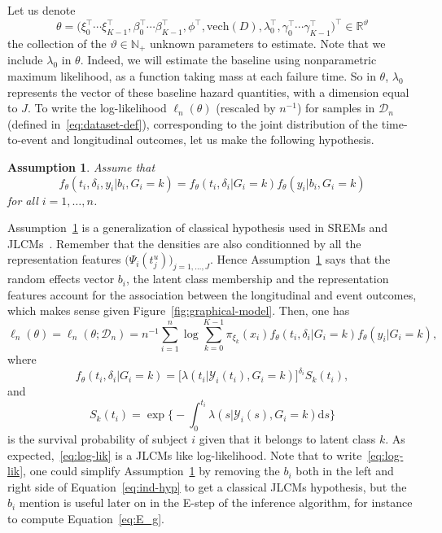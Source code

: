 \documentclass[11pt]{article}
\newtheorem{assumption}{Assumption}{\bf}{\rm}
\newcommand{\dd}{\mathrm{d}}
\newcommand{\cY}{\mathcal Y}
\newcommand{\cD}{\mathcal D}
\newcommand{\R}{\mathds R}
\newcommand{\N}{\mathds N}
\begin{document}
Let us denote 
\[ \theta = \big(\xi_0^\top \cdots \xi_{K-1}^\top, \beta_0^\top \cdots \beta_{K-1}^\top, \phi^\top, \text{vech}(D), \lambda_0^\top, \gamma_0^\top \cdots \gamma_{K-1}^\top\big)^\top \in \R^\vartheta \]
the collection of the $\vartheta \in \N_+$ unknown parameters to estimate. Note that we include $\lambda_0$ in $\theta$. Indeed, we will estimate the baseline using nonparametric maximum likelihood, as a function taking mass at each failure time. So in $\theta$, $\lambda_0$ represents the vector of these baseline hazard quantities, with a dimension equal to $J$.
To write the log-likelihood $\ell_n(\theta)$ (rescaled by $n^{-1}$)  for samples in $\cD_n$ (defined in~\eqref{eq:dataset-def}), corresponding to the joint distribution of the time-to-event and longitudinal outcomes, let us make the following hypothesis.
\begin{assumption}
\label{indep-hyp-3}
Assume that
\begin{equation}
  \label{eq:ind-hyp}
  f_\theta(t_i, \delta_i, y_i | b_i, G_i = k) = f_\theta(t_i, \delta_i| G_i = k) f_\theta(y_i | b_i, G_i = k)
\end{equation}
for all $i=1, \ldots, n$.
\end{assumption}
Assumption~\ref{indep-hyp-3} is a generalization of classical hypothesis used in SREMs and JLCMs~\citep{hickey2016joint}. Remember that the densities are also conditionned by all the representation features $\big(\Psi_i(t_j^u)\big)_{j=1,\ldots,J}$. Hence Assumption~\ref{indep-hyp-3} says that the random effects vector $b_i$, the latent class membership and the representation features account for the association between the longitudinal and event outcomes, which makes sense given Figure~\ref{fig:graphical-model}.
Then, one has
\begin{equation}
	\label{eq:log-lik}
	\ell_n(\theta) = \ell_n(\theta ; \cD_n) = n^{-1} \sum_{i=1}^n \log \sum_{k=0}^{K-1} \pi_{\xi_k}(x_i) f_\theta(t_i, \delta_i| G_i = k) f_\theta(y_i | G_i = k),
\end{equation}
where 
\[f_\theta(t_i, \delta_i| G_i = k) = \big[\lambda(t_i|\cY_i(t_i), G_i = k)\big]^{\delta_i} S_k(t_i) , \]
and
\begin{equation}
  \label{eq:survival-k-def}
  S_k(t_i) = \exp \Big\{-\int_0^{t_i} \lambda(s|\cY_i(s), G_i = k) \dd s \Big\}
\end{equation}
is the survival probability of subject $i$ given that it belongs to latent class $k$.
As expected,~\eqref{eq:log-lik} is a JLCMs like log-likelihood. Note that to write~\eqref{eq:log-lik}, one could simplify Assumption~\ref{indep-hyp-3} by removing the $b_i$ both in the left and right side of Equation~\eqref{eq:ind-hyp} to get a classical JLCMs hypothesis, but the $b_i$ mention is useful later on in the E-step of the inference algorithm, for instance to compute Equation~\eqref{eq:E_g}.
\end{document}
